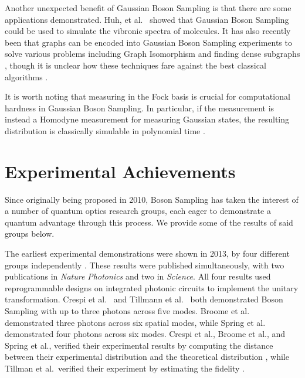 Another unexpected benefit of Gaussian Boson Sampling is that there are some applications demonstrated. Huh, et al.~\cite{huh2015} showed that Gaussian Boson Sampling could be used to simulate the vibronic spectra of molecules. It has also recently been that graphs can be encoded into Gaussian Boson Sampling experiments to solve various problems including Graph Isomorphism and finding dense subgraphs \cite{bradler2018, schuld2019, arrazola2018}, though it is unclear how these techniques fare against the best classical algorithms \cite{aaronson2019mottebailey}.

It is worth noting that measuring in the Fock basis is crucial for computational hardness in Gaussian Boson Sampling. In particular, if the measurement is instead a Homodyne measurement for measuring Gaussian states, the resulting distribution is classically simulable in polynomial time \cite{bartlett2003}.

\section{Experimental Achievements}
\label{sec:experimental-achievements}

Since originally being proposed in 2010, Boson Sampling has taken the interest of a number of quantum optics research groups, each eager to demonstrate a quantum advantage through this process. We provide some of the results of said groups below.

The earliest experimental demonstrations were shown in 2013, by four different groups independently \cite{broome2013, spring2013, tillmann2013, crespi2013}. These results were published simultaneously, with two publications in \emph{Nature Photonics} and two in \emph{Science}. All four results used reprogrammable designs on integrated photonic circuits to implement the unitary transformation. Crespi et al.~\cite{crespi2013} and Tillmann et al.~\cite{tillmann2013} both demonstrated Boson Sampling with up to three photons across five modes. Broome et al.~\cite{broome2013} demonstrated three photons across six spatial modes, while Spring et al.~\cite{spring2013} demonstrated four photons across six modes. Crespi et al., Broome et al., and Spring et al., verified their experimental results by computing the distance between their experimental distribution and the theoretical distribution \cite{spring2013, tillmann2013, crespi2013}, while Tillman et al.\ verified their experiment by estimating the fidelity \cite{tillmann2013}.


